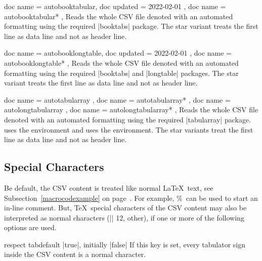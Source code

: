 \documentclass[a4paper,11pt]{ltxdoc}
\begin{document}
\begin{docCsvKeys}[
    doc parameter   = {=\meta{file name}},
    doc description = no default,
  ]
  {
    { doc name = autobooktabular, doc updated = {2022-02-01}  },
    { doc name = autobooktabular* },
  }
  Reads the whole CSV file denoted  with an automated formatting
  using the required |booktabs| package.
  The star variant treats the first line as data line and not as header line.
\end{docCsvKeys}


\begin{docCsvKeys}[
    doc parameter   = {=\meta{file name}},
    doc description = no default,
  ]
  {
    { doc name = autobooklongtable, doc updated = {2022-02-01}  },
    { doc name = autobooklongtable* },
  }
  Reads the whole CSV file denoted  with an automated formatting
  using the required |booktabs| and |longtable| packages.
  The star variant treats the first line as data line and not as header line.
\end{docCsvKeys}


\begin{docCsvKeys}[
    doc parameter   = {=\meta{file name}},
    doc description = no default,
    doc new = {2023-10-13}
  ]
  {
    { doc name = autotabularray },
    { doc name = autotabularray* },
    { doc name = autolongtabularray },
    { doc name = autolongtabularray* },
  }
  Reads the whole CSV file denoted  with an automated formatting
  using the required |tabularray| package.
   uses the  environment and
   uses the  environment.
  The star variants treat the first line as data line and not as header line.
\end{docCsvKeys}


\clearpage
\subsection{Special Characters}\label{subsec:specchar}
Be default, the CSV content is treated like normal \LaTeX\ text, see
Subsection~\ref{macrocodexample} on page~\pageref{macrocodexample}.
For example, \%~can be used to start an in-line comment.
But, \TeX\ special characters of the CSV content may also be interpreted
as normal characters (|\catcode| 12, other), if one or more of the following options are used.

\begin{docCsvKey}{respect tab}{}{default |true|, initially |false|}
  If this key is set, every
  tabulator sign
  inside the CSV content is a normal character.
\end{docCsvKey}
\end{document}
